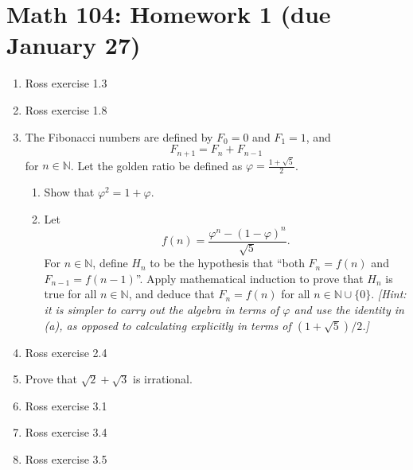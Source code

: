 \documentclass[12pt]{article}
\newcommand{\N}{\mathbb{N}}
\begin{document}
\section*{Math 104: Homework 1 (due January 27)}
\begin{enumerate}
  \item Ross exercise 1.3
  \item Ross exercise 1.8
  \item The Fibonacci numbers are defined by $F_0=0$ and $F_1=1$,
    and
    \[
    F_{n+1} = F_n+F_{n-1}
    \]
    for $n\in \N$. Let the golden ratio be defined as
    $\varphi=\frac{1+\sqrt{5}}{2}$.
    \begin{enumerate}
      \item Show that $\varphi^2=1+\varphi$.
      \item Let
	\[
	f(n)=\frac{\varphi^n-(1-\varphi)^n}{\sqrt{5}}.
	\]
	For $n\in \N$, define $H_n$ to be the hypothesis that ``both
	$F_n=f(n)$ and $F_{n-1}=f(n-1)$''. Apply mathematical induction to
	prove that $H_n$ is true for all $n \in \N$, and deduce that
	$F_n=f(n)$ for all $n \in \N \cup \{0\}$.
	{\it [Hint: it is simpler to carry out the algebra in terms of
	$\varphi$ and use the identity in (a), as opposed to calculating
	explicitly in terms of $(1+\sqrt{5})/2$.]}
    \end{enumerate}
  \item Ross exercise 2.4
  \item Prove that $\sqrt{2}+\sqrt{3}$ is irrational.
  \item Ross exercise 3.1
  \item Ross exercise 3.4
  \item Ross exercise 3.5
\end{enumerate}
\end{document}
